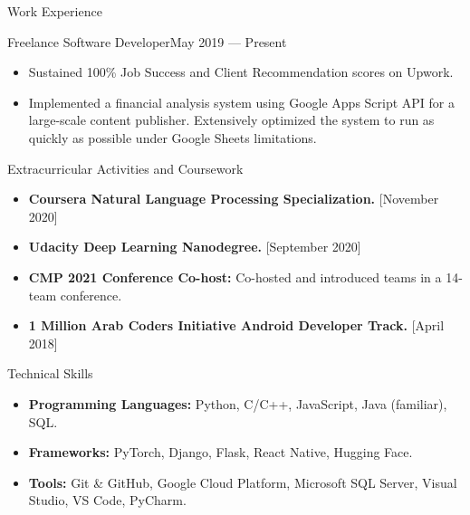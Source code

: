 \documentclass[]{mcdowellcv}
\begin{document}
	\begin{cvsection}{Work Experience}
		\begin{cvsubsection}{Freelance Software Developer}{}{May 2019 — Present}
			\begin{itemize}
				\item Sustained 100\% Job Success and Client Recommendation scores on Upwork.
				\item Implemented a financial analysis system using Google Apps Script API for a large-scale content publisher. Extensively optimized the system to run as quickly as possible under Google Sheets limitations.
			\end{itemize}
		\end{cvsubsection}
	\end{cvsection}
	
	\begin{cvsection}{Extracurricular Activities and Coursework}
		\begin{cvsubsection}{}{}{}
			\begin{itemize}
				\item \textbf{Coursera Natural Language Processing Specialization.} [November 2020]
				\item \textbf{Udacity Deep Learning Nanodegree.} [September 2020]
				\item \textbf{CMP 2021 Conference Co-host:} Co-hosted and introduced teams in a 14-team conference.
				\item \textbf{1 Million Arab Coders Initiative Android Developer Track.} [April 2018]
			\end{itemize}
		\end{cvsubsection}
	\end{cvsection}
	
	\begin{cvsection}{Technical Skills}
		\begin{cvsubsection}{}{}{}
			\begin{itemize}
				\item \textbf{Programming Languages:} Python, C/C++, JavaScript, Java (familiar), SQL.
				\item \textbf{Frameworks:} PyTorch, Django, Flask, React Native, Hugging Face.
				\item \textbf{Tools:} Git \& GitHub, Google Cloud Platform, Microsoft SQL Server, Visual Studio, VS Code, PyCharm.
			\end{itemize}
		\end{cvsubsection}
	\end{cvsection}
	
\end{document}
